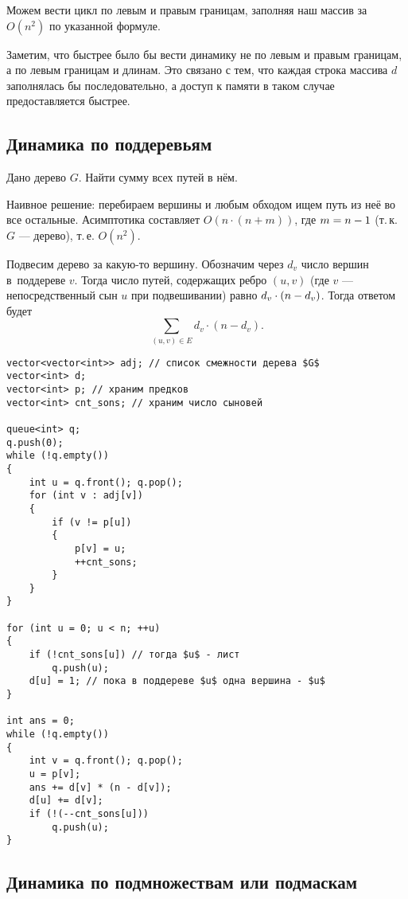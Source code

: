 Можем вести цикл по левым и правым границам, заполняя наш массив за $O(n^2)$ по указанной формуле.

\begin{remark}
    Заметим, что быстрее было бы вести динамику не по левым и правым границам, а по левым границам и длинам. Это связано с тем, что каждая строка массива $d$ заполнялась бы последовательно, а доступ к памяти в таком случае предоставляется быстрее.
\end{remark}

\subsection{Динамика по поддеревьям}

\begin{problem}
    Дано дерево $G$. Найти сумму всех путей в нём.
\end{problem}

Наивное решение: перебираем вершины и любым обходом ищем путь из неё во все остальные. Асимптотика составляет $O(n \cdot (n + m))$, где $m \hm = n - 1$ (т.\,к. $G$ --- дерево), т.\,е. $O(n^2)$.

Подвесим дерево за какую-то вершину. Обозначим через $d_v$ число вершин в~поддереве $v$. Тогда число путей, содержащих ребро $(u, v)$ (где $v$ --- непосредственный сын $u$ при подвешивании) равно $d_v \cdot (n \hm - d_v)$. Тогда ответом будет
\[
    \sum\limits_{(u, v) \in E}d_v \cdot (n - d_v).
\]

\begin{verbatim}
vector<vector<int>> adj; // список смежности дерева $G$
vector<int> d;
vector<int> p; // храним предков
vector<int> cnt_sons; // храним число сыновей

queue<int> q;
q.push(0);
while (!q.empty())
{
    int u = q.front(); q.pop();
    for (int v : adj[v])
    {
        if (v != p[u])
        {
            p[v] = u;
            ++cnt_sons;
        }
    }
}

for (int u = 0; u < n; ++u)
{
    if (!cnt_sons[u]) // тогда $u$ - лист
        q.push(u);
    d[u] = 1; // пока в поддереве $u$ одна вершина - $u$
}

int ans = 0;
while (!q.empty())
{
    int v = q.front(); q.pop();
    u = p[v];
    ans += d[v] * (n - d[v]);
    d[u] += d[v];
    if (!(--cnt_sons[u]))
        q.push(u);
}
\end{verbatim}

\subsection{Динамика по подмножествам или подмаскам}

